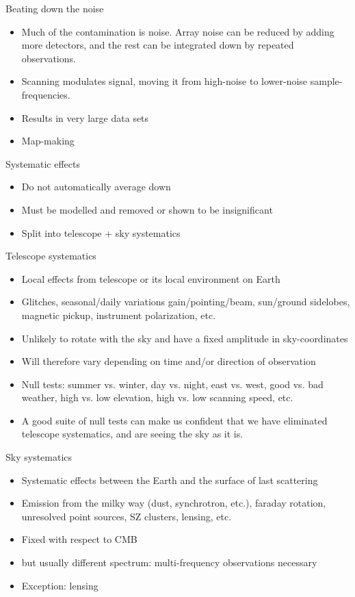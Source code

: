 \documentclass{beamer}
\begin{document}
\begin{frame}{Beating down the noise}
	\begin{itemize}
		\item Much of the contamination is noise. Array noise can be reduced by
			adding more detectors, and the rest can be integrated down by repeated
			observations.
		\item Scanning modulates signal, moving it from high-noise to lower-noise
			sample-frequencies.
		\item Results in very large data sets
		\item Map-making
	\end{itemize}
\end{frame}

\begin{frame}{Systematic effects}
	\begin{itemize}
		\item Do not automatically average down
		\item Must be modelled and removed or shown to be insignificant
		\item Split into telescope + sky systematics
	\end{itemize}
\end{frame}

\begin{frame}{Telescope systematics}
	\begin{itemize}
		\item Local effects from telescope or its local environment on Earth
		\item Glitches, seasonal/daily variations gain/pointing/beam, sun/ground sidelobes,
			magnetic pickup, instrument polarization, etc.
		\item Unlikely to rotate with the sky and have a fixed amplitude in sky-coordinates
		\item Will therefore vary depending on time and/or direction of observation
		\item Null tests: summer vs. winter, day vs. night, east vs. west, good vs. bad
			weather, high vs. low elevation, high vs. low scanning speed, etc.
		\item A good suite of null tests can make us confident that we have eliminated
			telescope systematics, and are seeing the sky as it is.
	\end{itemize}
\end{frame}

\begin{frame}{Sky systematics}
	\begin{itemize}
		\item Systematic effects between the Earth and the surface of last scattering
		\item Emission from the milky way (dust, synchrotron, etc.), faraday rotation,
			unresolved point sources, SZ clusters, lensing, etc.
		\item Fixed with respect to CMB
		\item but usually different spectrum: multi-frequency observations necessary
		\item Exception: lensing
	\end{itemize}
\end{frame}
\end{document}
